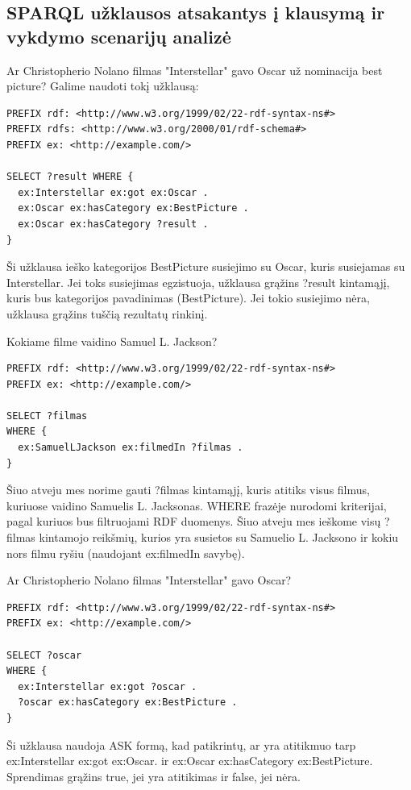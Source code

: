 \documentclass{VUMIFPSkursinis}
\begin{document}
\subsection{SPARQL užklausos atsakantys į klausymą ir vykdymo scenarijų analizė}
Ar Christopherio Nolano filmas "Interstellar" gavo Oscar už nominacija best picture?
Galime naudoti tokį užklausą:
\begin{lstlisting}[captionpos=b, caption=Užklausa 1, label=lst:sparql,
   basicstyle=\ttfamily,frame=single]
PREFIX rdf: <http://www.w3.org/1999/02/22-rdf-syntax-ns#>
PREFIX rdfs: <http://www.w3.org/2000/01/rdf-schema#>
PREFIX ex: <http://example.com/>

SELECT ?result WHERE {
  ex:Interstellar ex:got ex:Oscar .
  ex:Oscar ex:hasCategory ex:BestPicture .
  ex:Oscar ex:hasCategory ?result .
}
\end{lstlisting}

Ši užklausa ieško kategorijos BestPicture susiejimo su Oscar, kuris susiejamas su Interstellar. Jei toks susiejimas egzistuoja, užklausa grąžins ?result kintamąjį, kuris bus kategorijos pavadinimas (BestPicture). Jei tokio susiejimo nėra, užklausa grąžins tuščią rezultatų rinkinį.
\pagebreak

Kokiame filme vaidino Samuel L. Jackson?
\begin{lstlisting}[captionpos=b, caption=Užklausa 2, label=lst:sparql,
   basicstyle=\ttfamily,frame=single]
PREFIX rdf: <http://www.w3.org/1999/02/22-rdf-syntax-ns#>
PREFIX ex: <http://example.com/>

SELECT ?filmas
WHERE {
  ex:SamuelLJackson ex:filmedIn ?filmas .
}
\end{lstlisting}

Šiuo atveju mes norime gauti ?filmas kintamąjį, kuris atitiks visus filmus, kuriuose vaidino Samuelis L. Jacksonas.
WHERE frazėje nurodomi kriterijai, pagal kuriuos bus filtruojami RDF duomenys. Šiuo atveju mes ieškome visų ?filmas kintamojo reikšmių, kurios yra susietos su Samuelio L. Jacksono ir kokiu nors filmu ryšiu (naudojant ex:filmedIn savybę).

Ar Christopherio Nolano filmas "Interstellar" gavo Oscar?
\begin{lstlisting}[captionpos=b, caption=Užklausa 3, label=lst:sparql,
   basicstyle=\ttfamily,frame=single]
PREFIX rdf: <http://www.w3.org/1999/02/22-rdf-syntax-ns#>
PREFIX ex: <http://example.com/>

SELECT ?oscar
WHERE {
  ex:Interstellar ex:got ?oscar .
  ?oscar ex:hasCategory ex:BestPicture .
}

\end{lstlisting}
Ši užklausa naudoja ASK formą, kad patikrintų, ar yra atitikmuo tarp ex:Interstellar ex:got ex:Oscar. ir ex:Oscar ex:hasCategory ex:BestPicture. 
Sprendimas grąžins true, jei yra atitikimas ir false, jei nėra.
\end{document}
